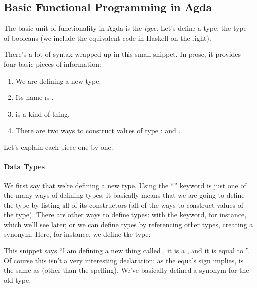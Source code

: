 \subsection{Basic Functional Programming in Agda}
The basic unit of functionality in Agda is the \emph{type}.
Let's define a type: the type of booleans (we include the equivalent code in
Haskell on the right).
\begin{agdalisting} \label{bool-def}
  \begin{multicols}{2} \centering
     \columnbreak
  \end{multicols}\vspace{-2\baselineskip}
\end{agdalisting}
There's a lot of syntax wrapped up in this small snippet.
In prose, it provides four basic pieces of information:
\begin{samepage}
\begin{enumerate}
  \item We are defining a new  type.
  \item Its name is .
  \item {} is a  kind of thing.
  \item There are two ways to construct values of type :
     and .
\end{enumerate}
\end{samepage}
Let's explain each piece one by one.

\paragraph{Data Types}
We first say that we're defining a new  type.
Using the ``'' keyword is just one of the many ways of
defining types: it basically means that we are going to define the type by
listing all of its constructors (all of the ways to construct values of the
type).
There are other ways to define types: with the  keyword, for
instance, which we'll see later; or we can define types by referencing other
types, creating a synonym.
Here, for instance, we define the  type:
\begin{agdalisting*}
  \begin{multicols}{2} \centering
     \columnbreak
  \end{multicols}\vspace{-\baselineskip}
\end{agdalisting*}
This snippet says ``I am defining a new thing called , it
is a , and it is equal to ''.
Of course this isn't a very interesting declaration: as the equals sign implies,
 is the same as  (other than the
spelling).
We've basically defined a synonym for the old type.


